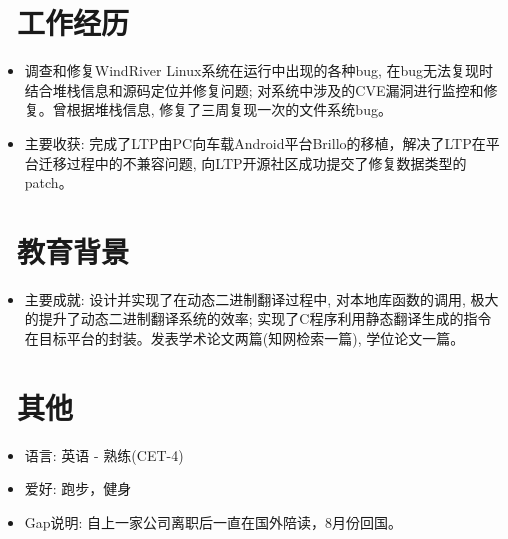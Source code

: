\documentclass{resume}
\begin{document}
\section{\faUsers\ 工作经历}
\begin{itemize}
\item {调查和修复WindRiver Linux系统在运行中出现的各种bug, 在bug无法复现时结合堆栈信息和源码定位并修复问题; 对系统中涉及的CVE漏洞进行监控和修复。曾根据堆栈信息, 修复了三周复现一次的文件系统bug。}
\end{itemize}
\begin{itemize}
\item {主要收获: 完成了LTP由PC向车载Android平台Brillo的移植，解决了LTP在平台迁移过程中的不兼容问题, 向LTP开源社区成功提交了修复数据类型的patch。}
\end{itemize}

\section{\faGraduationCap\  教育背景}
\begin{itemize}
\item {主要成就: 设计并实现了在动态二进制翻译过程中, 对本地库函数的调用, 极大的提升了动态二进制翻译系统的效率; 实现了C程序利用静态翻译生成的指令在目标平台的封装。发表学术论文两篇(知网检索一篇), 学位论文一篇。}
\end{itemize}


\section{\faInfo\ 其他}
\begin{itemize}[parsep=0.5ex]
  \item {语言: 英语 - 熟练(CET-4)}
  \item {爱好: 跑步，健身}
  \item {Gap说明: 自上一家公司离职后一直在国外陪读，8月份回国。}
\end{itemize}
\end{document}
